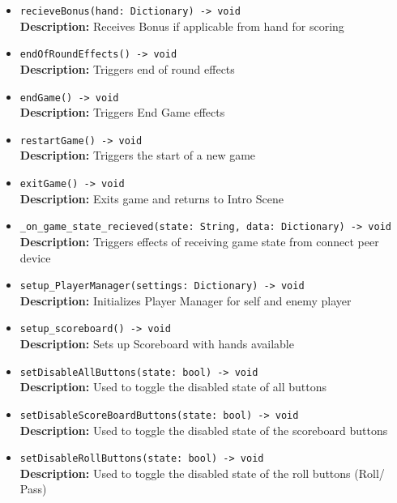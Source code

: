 \documentclass[12pt, titlepage]{article}
\begin{document}
\begin{itemize}
    \item \texttt{recieveBonus(hand: Dictionary) -> void}\\
    \textbf{Description:} Receives Bonus if applicable from hand for scoring
    
    \item \texttt{endOfRoundEffects() -> void}\\
    \textbf{Description:} Triggers end of round effects
    
    \item \texttt{endGame() -> void}\\
    \textbf{Description:}  Triggers End Game effects
    
    \item \texttt{restartGame() -> void}\\
    \textbf{Description:} Triggers the start of a new game
    
    \item \texttt{exitGame() -> void}\\
    \textbf{Description:} Exits game and returns to Intro Scene
    
    \item \texttt{\_on\_game\_state\_recieved(state: String, data: Dictionary) -> void}\\
    \textbf{Description:} Triggers effects of receiving game state from connect peer device
    
    \item \texttt{setup\_PlayerManager(settings: Dictionary) -> void}\\
    \textbf{Description:} Initializes Player Manager for self and enemy player
    
    \item \texttt{setup\_scoreboard() -> void}\\
    \textbf{Description:} Sets up Scoreboard with hands available
    
    \item \texttt{setDisableAllButtons(state: bool) -> void}\\
    \textbf{Description:} Used to toggle the disabled state of all buttons
    
    \item \texttt{setDisableScoreBoardButtons(state: bool) -> void}\\
    \textbf{Description:} Used to toggle the disabled state of the scoreboard buttons
    
    \item \texttt{setDisableRollButtons(state: bool) -> void}\\
    \textbf{Description:} Used to toggle the disabled state of the roll buttons (Roll/ Pass)
    

\end{itemize}
\end{document}
